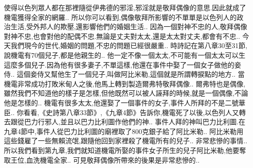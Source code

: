 \documentclass{book}
\begin{document}
使得以色列眾人都在那裡隨從伊弗德的邪淫,邪淫就是敬拜偶像的意思.因此就成了機電獲得全家的網羅..
所以你可以看到,偶像敬拜所影響的不單單是以色列人的政治生活,受外邦人的欺壓,還影響他們的婚姻生活..
因為一個對神不忠的人,敬拜偶像對神不忠,也會對他的配偶不忠.無論是丈夫對太太,還是太太對丈夫,都會有不忠..
今天我們現今的世代,婚姻的問題,不忠的問題已經很嚴重..
時詩記在第八章30至31節,說機電有70個兒子,都是他親生的..
他一定不像一個太太,不可能有一個太太可以生這麼多個兒子.因為他有很多妻子,不單這樣,他還在事件中娶了一個女子做他的妾侍..
這個妾侍又幫他生了一個兒子,叫做阿比米勒,這個就是所謂轉捩點的地方..
當機電非常成功打敗米甸人之後,他馬上轉到製造爾弗特敬拜偶像..
爾弗特也是偶像,雖然我們不知道他的樣子是怎樣,但他既然可以被人誣拜的時候,就是一個偶像,不論他是怎樣的..
機電有很多太太,他還娶了一個事件的女子,事件人所拜的不是二號華臣..
你看看,《史詩第八章33節》,《九章4節》告訴你,機電死了以後,以色列人又轉去跟從巴力行邪人,並且以巴力比利圖作他們的神..
事件人拜的神叫巴力比利圖.在九章4節中,事件人從巴力比利圖的廟裡取了800克銀子給了阿比米勒..
阿比米勒用這些錢雇了一些無賴流氓,跟隨他回到家裡殺了機電所有的兒子..
非常悲慘的事情..
所以我們看到第九章,我們就知道機電所娶的事件女子所生的兒子阿比米勒,他要奪取王位,血洗機電全家..
可見敬拜偶像所帶來的後果是非常悲慘的..
\end{document}
